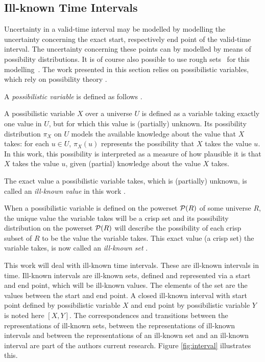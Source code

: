 \subsection{Ill-known Time Intervals}
\label{subsec:representation-time-intervals}
Uncertainty in a valid-time interval may be modelled by modelling the uncertainty concerning the exact start, respectively end point of the valid-time interval. The uncertainty concerning these points can by modelled by means of possibility distributions. It is of course also possible to use rough sets~\cite{Pawlak1995} for this modelling~\cite{Qia09}. The work presented in this section relies on possibilistic variables, which rely on possibility theory \cite{Dubois:Prade:1988:PossibilityTheory}.

A \emph{possibilistic variable} is defined as follows \cite{Pon11}.

\begin{svgraybox}
\vspace{-10pt}
\begin{definition}
A possibilistic variable $X$ over a universe $U$ is defined as a variable taking exactly one value in $U$, but for which this value is (partially) unknown. Its possibility distribution $\pi_X$ on $U$ models the available knowledge about the value that $X$ takes: for each $u\in U$, $\pi_X(u)$ represents the possibility that $X$ takes the value $u$. In this work, this possibility is interpreted as a measure of how plausible it is that $X$ takes the value $u$, given (partial) knowledge about the value $X$ takes.
\end{definition}
\vspace{-10pt}
\end{svgraybox}

The exact value a possibilistic variable takes, which is (partially) unknown, is called an \emph{ill-known value} in this work \cite{Dubois88b}.

When a possibilistic variable is defined on the powerset $\mathcal{P}(R)$ of some universe $R$, the unique value the variable takes will be a crisp set and its possibility distribution on the powerset $\mathcal{P}(R)$ will describe the possibility of each crisp subset of $R$ to be the value the variable takes. This exact value (a crisp set) the variable takes, is now called an \emph{ill-known set} \cite{Dubois88b}.

This work will deal with ill-known time intervals. These are ill-known intervals in time. Ill-known intervals are ill-known sets, defined and represented via a start and end point, which will be ill-known values. The elements of the set are the values between the start and end point. A closed ill-known interval with start point defined by possibilistic variable $X$ and end point by possibilistic variable $Y$ is noted here $\left[X, Y\right]$. The correspondences and transitions between the representations of ill-known sets, between the representations of ill-known intervals and between the representations of an ill-known set and an ill-known interval are part of the authors current research. Figure \ref{fig:interval} illustrates this.

